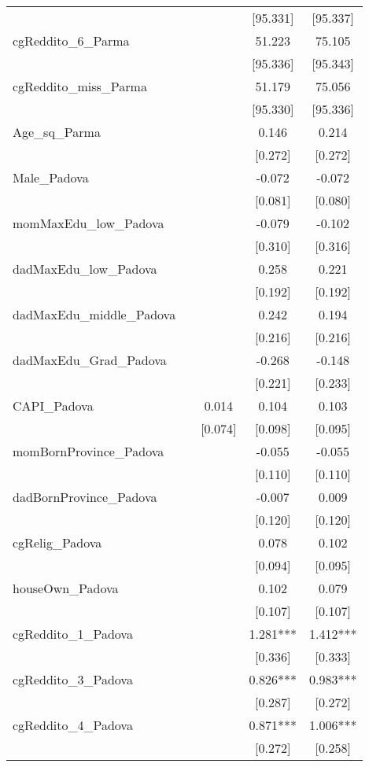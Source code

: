 \documentclass[]{article}
\begin{document}
\begin{tabular}{lcccc}
 &  &  & [95.331] & [95.337] \\
cgReddito\_6\_Parma &  &  & 51.223 & 75.105 \\
 &  &  & [95.336] & [95.343] \\
cgReddito\_miss\_Parma &  &  & 51.179 & 75.056 \\
 &  &  & [95.330] & [95.336] \\
Age\_sq\_Parma &  &  & 0.146 & 0.214 \\
 &  &  & [0.272] & [0.272] \\
Male\_Padova &  &  & -0.072 & -0.072 \\
 &  &  & [0.081] & [0.080] \\
momMaxEdu\_low\_Padova &  &  & -0.079 & -0.102 \\
 &  &  & [0.310] & [0.316] \\
dadMaxEdu\_low\_Padova &  &  & 0.258 & 0.221 \\
 &  &  & [0.192] & [0.192] \\
dadMaxEdu\_middle\_Padova &  &  & 0.242 & 0.194 \\
 &  &  & [0.216] & [0.216] \\
dadMaxEdu\_Grad\_Padova &  &  & -0.268 & -0.148 \\
 &  &  & [0.221] & [0.233] \\
CAPI\_Padova &  & 0.014 & 0.104 & 0.103 \\
 &  & [0.074] & [0.098] & [0.095] \\
momBornProvince\_Padova &  &  & -0.055 & -0.055 \\
 &  &  & [0.110] & [0.110] \\
dadBornProvince\_Padova &  &  & -0.007 & 0.009 \\
 &  &  & [0.120] & [0.120] \\
cgRelig\_Padova &  &  & 0.078 & 0.102 \\
 &  &  & [0.094] & [0.095] \\
houseOwn\_Padova &  &  & 0.102 & 0.079 \\
 &  &  & [0.107] & [0.107] \\
cgReddito\_1\_Padova &  &  & 1.281*** & 1.412*** \\
 &  &  & [0.336] & [0.333] \\
cgReddito\_3\_Padova &  &  & 0.826*** & 0.983*** \\
 &  &  & [0.287] & [0.272] \\
cgReddito\_4\_Padova &  &  & 0.871*** & 1.006*** \\
 &  &  & [0.272] & [0.258] \\

\end{tabular}
\end{document}

